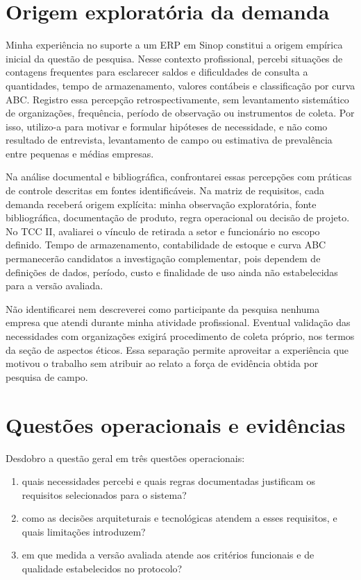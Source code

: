 \section{Origem exploratória da demanda}

Minha experiência no suporte a um ERP em Sinop constitui a origem empírica inicial da questão de pesquisa. Nesse contexto profissional, percebi situações de contagens frequentes para esclarecer saldos e dificuldades de consulta a quantidades, tempo de armazenamento, valores contábeis e classificação por curva ABC. Registro essa percepção retrospectivamente, sem levantamento sistemático de organizações, frequência, período de observação ou instrumentos de coleta. Por isso, utilizo-a para motivar e formular hipóteses de necessidade, e não como resultado de entrevista, levantamento de campo ou estimativa de prevalência entre pequenas e médias empresas.

Na análise documental e bibliográfica, confrontarei essas percepções com práticas de controle descritas em fontes identificáveis. Na matriz de requisitos, cada demanda receberá origem explícita: minha observação exploratória, fonte bibliográfica, documentação de produto, regra operacional ou decisão de projeto. No TCC II, avaliarei o vínculo de retirada a setor e funcionário no escopo definido. Tempo de armazenamento, contabilidade de estoque e curva ABC permanecerão candidatos a investigação complementar, pois dependem de definições de dados, período, custo e finalidade de uso ainda não estabelecidas para a versão avaliada.

Não identificarei nem descreverei como participante da pesquisa nenhuma empresa que atendi durante minha atividade profissional. Eventual validação das necessidades com organizações exigirá procedimento de coleta próprio, nos termos da seção de aspectos éticos. Essa separação permite aproveitar a experiência que motivou o trabalho sem atribuir ao relato a força de evidência obtida por pesquisa de campo.

\section{Questões operacionais e evidências}

Desdobro a questão geral em três questões operacionais:
\begin{enumerate}
    \item quais necessidades percebi e quais regras documentadas justificam os requisitos selecionados para o sistema?
    \item como as decisões arquiteturais e tecnológicas atendem a esses requisitos, e quais limitações introduzem?
    \item em que medida a versão avaliada atende aos critérios funcionais e de qualidade estabelecidos no protocolo?
\end{enumerate}

